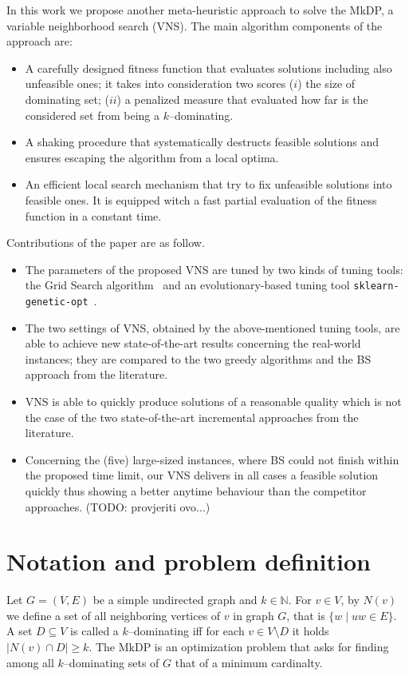 \documentclass[sigconf]{acmart}
\begin{document}
In this work we propose another meta-heuristic approach to solve the MkDP, a variable neighborhood search (VNS). The main algorithm components of the approach are:
\begin{itemize}
	\item A carefully designed fitness function that evaluates solutions  including also unfeasible ones; it takes into consideration two scores ($i$) the size of dominating set; ($ii$) a penalized measure that evaluated how far is the considered set from being a $k$--dominating. 
	\item A shaking procedure that systematically destructs feasible solutions and ensures escaping the algorithm from a local optima.
	\item An efficient local search mechanism that try to fix unfeasible solutions into feasible ones. It is equipped witch a fast partial evaluation of the fitness function in a constant time.
 
\end{itemize}
Contributions of the paper are as follow.
\begin{itemize}
	\item The parameters of the proposed VNS are tuned by two kinds of tuning tools: the Grid Search algorithm~\cite{ranjan2019k} and an evolutionary-based tuning tool \texttt{sklearn-genetic-opt}~\cite{Arenas_Gomez2022}.  
	\item The two settings of VNS, obtained by the above-mentioned tuning tools, are able to achieve new state-of-the-art results concerning the real-world instances; they are compared to the two greedy algorithms and the BS approach from the literature. 
	\item VNS is able to quickly produce solutions of a reasonable quality which is not the case of the two state-of-the-art incremental approaches from the literature.
	\item Concerning the (five) large-sized instances, where BS could not finish within the proposed time limit, our VNS delivers in all cases a feasible solution quickly thus showing a better anytime behaviour than the competitor approaches. (TODO: provjeriti ovo...)
\end{itemize}

\section{Notation and problem definition }
    

    Let $G=(V,E)$ be a simple undirected graph and $k \in \mathbb{N}$. For $v\in V$, by $N(v)$ we define a set of all neighboring vertices of $v$ in graph  $G$, that is $\{w \mid uw \in E\}$. A set $D \subseteq V$ is called a $k$--dominating iff for each $v\in V \setminus D$ it holds $|N(v) \cap D| \geq k$.  The MkDP is an optimization problem that asks for finding among all $k$--dominating sets of $G$ that of a minimum cardinalty. 
    
\end{document}
